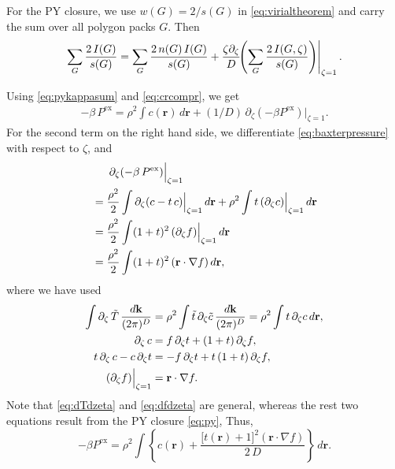 \documentclass[preprint]{revtex4-1}
\newcommand{\vct}[1]{\mathbf{#1}}
\providecommand{\vr}{} %
\renewcommand{\vr}{\vct{r}}
\newcommand{\vk}{\vct{k}}
\newcommand{\dvk}{\frac{d\vk}{(2\pi)^D}}
\newcommand{\supex}[1]{ { { #1 }^{ \mathrm{ex} } } }
\newcommand{\Pex}{\supex{P}}
\begin{document}
For the PY closure, we use $w(G) = 2/s(G)$
in \eqref{eq:virialtheorem}
and carry the sum over all polygon packs $G$.
%
Then
%
\begin{align*}
  \sum_G \frac{ 2 \, I(G) } { s(G) }
  =
  \sum_G \frac{ 2 \, n(G) \, I(G) } { s(G) }
  + \frac{ \zeta \partial_\zeta }{ D }
    \mkern-8mu \left. \left(
    \sum_G \frac{ 2 \, I(G, \zeta) } { s(G) }
    \right) \right|_{\zeta = 1}.
\end{align*}


Using \eqref{eq:pykappasum} and \eqref{eq:crcompr}, we get
\begin{align}
  -\beta \, \Pex
  =
  \rho^2 \int c(\vr) \, d\vr
  + (1/D) \,
      \partial_\zeta \left( -\beta \Pex \right)
    \Big|_{\zeta = 1}.
\label{eq:pyPsimp1}
\end{align}
%
For the second term on the right hand side,
we differentiate \eqref{eq:baxterpressure} with respect to $\zeta$,
and
\begin{align*}
&\hphantom{==}
\partial_\zeta (-\beta \, \Pex) \Big|_{\zeta=1}
\\
&=
\frac{\rho^2}{2}
\int
  \partial_\zeta (c - t \, c)
  \Big|_{\zeta = 1} \, d\vr
+ \rho^2 \int t \, (\partial_\zeta c) \Big|_{\zeta = 1} \, d\vr
\\
&=
\frac{\rho^2}{2}
\int (1+t)^2 \, (\partial_\zeta f) \Big|_{\zeta = 1} \, d\vr
\\
&=
\frac{\rho^2}{2}
\int (1+t)^2 \, (\vr \cdot \nabla f) \, d\vr,
\end{align*}
%
where we have used
\begin{align}
%
\int \partial_\zeta \, \tilde T \, \dvk
&=
  \rho^2 \int \tilde{t} \, \partial_\zeta \tilde{c} \, \dvk
=
  \rho^2 \int t \, \partial_\zeta c \, d\vr,
  \label{eq:dTdzeta} \\
%
  \partial_\zeta \, c
&=
  f \, \partial_\zeta t
  + (1 + t) \, \partial_\zeta f,
  \notag \\
%
  t \, \partial_\zeta \, c - c \, \partial_\zeta t
&=
  -f \, \partial_\zeta t
  + t \, (1 + t) \, \partial_\zeta f,
  \notag \\
%
  (\partial_\zeta f) \Big|_{\zeta = 1}
&= \vr \cdot \nabla f.
  \label{eq:dfdzeta}
\end{align}
%
Note that \eqref{eq:dTdzeta} and \eqref{eq:dfdzeta} are general,
whereas the rest two equations result from the PY closure \eqref{eq:py},
%
Thus,
\begin{equation}
  -\beta \Pex = \rho^2 \int
  \left\{ c(\vr)
    + \frac{ \big[ t(\vr) + 1 \big]^2 (\vr \cdot \nabla f) }
           { 2 \, D }
  \right\} \, d\vr.
  \label{eq:pyPsimplified}
\end{equation}
\end{document}
